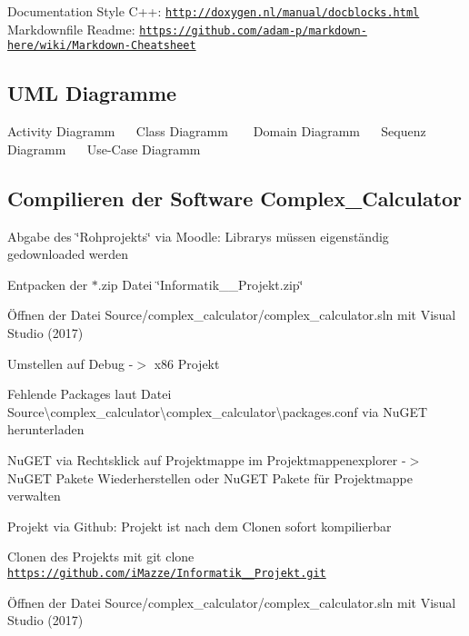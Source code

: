 Documentation Style C++\+: \href{http://doxygen.nl/manual/docblocks.html}{\tt http\+://doxygen.\+nl/manual/docblocks.\+html} ~\newline
 Markdownfile Readme\+: \href{https://github.com/adam-p/markdown-here/wiki/Markdown-Cheatsheet}{\tt https\+://github.\+com/adam-\/p/markdown-\/here/wiki/\+Markdown-\/\+Cheatsheet}

\subsection*{U\+ML Diagramme}

Activity Diagramm~\newline
  ~\newline
 Class Diagramm ~\newline
  ~\newline
 Domain Diagramm~\newline
  ~\newline
 Sequenz Diagramm~\newline
  ~\newline
 Use-\/\+Case Diagramm~\newline
 

\subsection*{Compilieren der Software Complex\+\_\+\+Calculator}

Abgabe des \char`\"{}\+Rohprojekts\char`\"{} via Moodle\+: Librarys müssen eigenständig gedownloaded werden
\begin{DoxyItemize}
\item Entpacken der $\ast$.zip Datei \char`\"{}\+Informatik\+\_\+\_\+\+Projekt.\+zip\char`\"{}
\item Öffnen der Datei Source/complex\+\_\+calculator/complex\+\_\+calculator.\+sln mit Visual Studio (2017)
\item Umstellen auf Debug -\/$>$ x86 Projekt
\item Fehlende Packages laut Datei Source\textbackslash{}complex\+\_\+calculator\textbackslash{}complex\+\_\+calculator\textbackslash{}packages.\+conf via Nu\+G\+ET herunterladen
\item Nu\+G\+ET via Rechtsklick auf Projektmappe im Projektmappenexplorer -\/$>$ Nu\+G\+ET Pakete Wiederherstellen oder Nu\+G\+ET Pakete für Projektmappe verwalten
\end{DoxyItemize}

Projekt via Github\+: Projekt ist nach dem Clonen sofort kompilierbar
\begin{DoxyItemize}
\item Clonen des Projekts mit {\ttfamily git clone \href{https://github.com/iMazze/Informatik_4_Projekt.git}{\tt https\+://github.\+com/i\+Mazze/\+Informatik\+\_\+\_\+\+Projekt.\+git}}
\item Öffnen der Datei Source/complex\+\_\+calculator/complex\+\_\+calculator.\+sln mit Visual Studio (2017)
\end{DoxyItemize}

